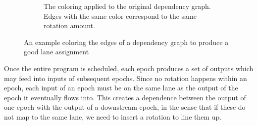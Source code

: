 \begin{figure}
\begin{subfigure}{0.24\textwidth}
        \caption{The coloring applied to the original dependency graph. Edges with the same color correspond to the same rotation amount.}\label{fig:colored-dependence-graph}
    \end{subfigure}
    \caption{An example coloring the edges of a dependency graph to produce a good lane assignment}\label{fig:lane-assignment}
\end{figure}

Once the entire program is scheduled, each epoch produces a set of outputs which may feed into inputs of subsequent epochs.
Since no rotation happens within an epoch, each input of an epoch must be on the same lane as the output of the epoch it eventually flows into.
This creates a dependence between the output of one epoch with the output of a downstream epoch, in the sense that if these do not map to the same lane, we need to insert a rotation to line them up.

